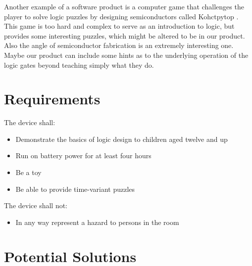 \documentclass[12pt]{report}
\begin{document}
Another example of a software product is a computer game that challenges the player to solve logic puzzles by designing semiconductors called Kohctpytop \cite{3}. This game is too hard and complex to serve as an introduction to logic, but provides some interesting puzzles, which might be altered to be in our product. Also the angle of semiconductor fabrication is an extremely interesting one. Maybe our product can include some hints as to the underlying operation of the logic gates beyond teaching simply what they do.

\section*{Requirements}

The device shall:
\begin{itemize}

\item Demonstrate the basics of logic design to children aged twelve and up
\item Run on battery power for at least four hours
\item Be a toy
\item Be able to provide time-variant puzzles

\end{itemize}

\noindent The device shall not:
\begin{itemize}

\item In any way represent a hazard to persons in the room

\end{itemize}

\section*{Potential Solutions}
\end{document}
